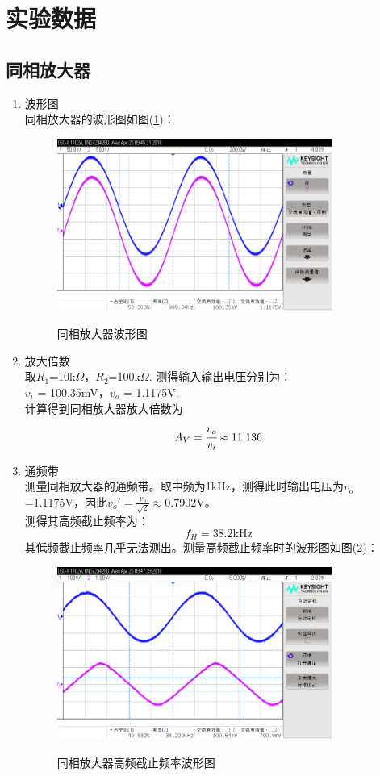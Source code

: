 \documentclass[a4paper]{article}
\begin{document}
\section{实验数据}
\subsection{同相放大器}
\begin{enumerate}
\item 波形图\\
同相放大器的波形图如图(\ref{fig1})：
\begin{figure}[!h]
\centering
\includegraphics[width=9cm]{fig/1cope_2_r.png}\\
\caption{同相放大器波形图}\label{fig1}
\end{figure}
\item 放大倍数\\
取$R_1$=10k$\Omega$，$R_2$=100k$\Omega$. 测得输入输出电压分别为：\\
$v_i$ = 100.35mV，$v_o$ = 1.1175V.\\
计算得到同相放大器放大倍数为
\begin{equation}
A_V = \cfrac{v_o}{v_i} \approx 11.136
\end{equation}
\item 通频带\\
测量同相放大器的通频带。取中频为1kHz，测得此时输出电压为$v_o$=1.1175V，因此$v_o' = \frac{v_o}{\sqrt{2}} \approx$0.7902V。\\
测得其高频截止频率为：
$$f_H = 38.2\text{kHz}$$
其低频截止频率几乎无法测出。测量高频截止频率时的波形图如图(\ref{fig2})：
\begin{figure}[!h]
\centering
\includegraphics[width=9cm]{fig/2cope_3_r.png}\\
\caption{同相放大器高频截止频率波形图}\label{fig2}
\end{figure}
\end{enumerate}
\end{document}
